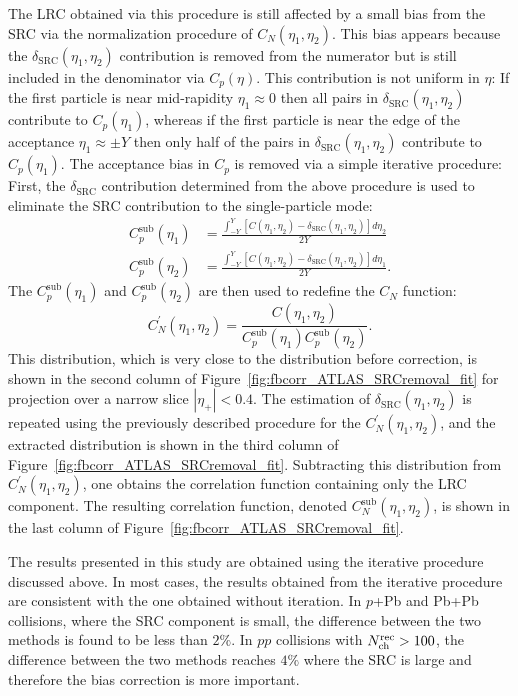 The LRC obtained via this procedure is still affected by a small bias from the SRC via the normalization procedure of $C_N(\eta_1, \eta_2)$. This bias appears because the $\delta_\text{SRC}(\eta_1, \eta_2)$ contribution is removed from the numerator but is still included in the denominator via $C_p(\eta)$. This contribution is not uniform in $\eta$: If the first particle is near mid-rapidity $\eta_1 \approx 0$ then all pairs in $\delta_\text{SRC}(\eta_1, \eta_2)$ contribute to $C_p(\eta_1)$, whereas if the first particle is near the edge of the acceptance $\eta_1 \approx \pm Y$ then only half of the pairs in $\delta_\text{SRC}(\eta_1, \eta_2)$ contribute to $C_p(\eta_1)$. The acceptance bias in $C_p$ is removed via a simple iterative procedure: First, the $\delta_\text{SRC}$ contribution determined from the above procedure is used to eliminate the SRC contribution to the single-particle mode:
\begin{equation}
\begin{split}
C_p^\text{sub}(\eta_1) &= \frac{\int_{-Y}^Y [C(\eta_1, \eta_2) - \delta_\text{SRC}(\eta_1, \eta_2)] d\eta_2}{2Y} \\
C_p^\text{sub}(\eta_2) &= \frac{\int_{-Y}^Y [C(\eta_1, \eta_2) - \delta_\text{SRC}(\eta_1, \eta_2)] d\eta_1}{2Y}.
\end{split}
\end{equation}
The $C_p^\text{sub}(\eta_1)$ and $C_p^\text{sub}(\eta_2)$ are then used to redefine the $C_N$ function:
\begin{equation}
C_N^{'}(\eta_1, \eta_2) = \frac{C(\eta_1, \eta_2)}{C_p^\text{sub}(\eta_1) C_p^\text{sub}(\eta_2)}.
\end{equation}
This distribution, which is very close to the distribution before correction, is shown in the second column of Figure~\ref{fig:fbcorr_ATLAS_SRCremoval_fit} for projection over a narrow slice $|\eta_+|<0.4$. The estimation of $\delta_\text{SRC}(\eta_1, \eta_2)$ is repeated using the previously described procedure for the $C_N^{'}(\eta_1, \eta_2)$, and the extracted distribution is shown in the third column of Figure~\ref{fig:fbcorr_ATLAS_SRCremoval_fit}. Subtracting this distribution from $C_N^{'}(\eta_1, \eta_2)$, one obtains the correlation function containing only the LRC component. The resulting correlation function, denoted $C_N^\text{sub}(\eta_1, \eta_2)$, is shown in the last column of Figure~\ref{fig:fbcorr_ATLAS_SRCremoval_fit}.

The results presented in this study are obtained using the iterative procedure discussed above. In most cases, the results obtained from the iterative procedure are consistent with the one obtained without iteration. In $p$+Pb and Pb+Pb collisions, where the SRC component is small, the difference between the two methods is found to be less than $2\%$. In $pp$ collisions with $N_\text{ch}^\text{rec}>100$, the difference between the two methods reaches $4\%$ where the SRC is large and therefore the bias correction is more important.


